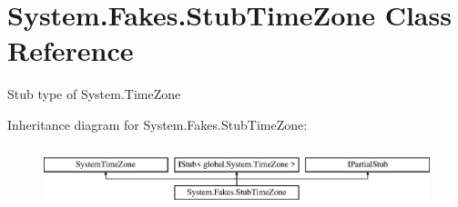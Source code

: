 \hypertarget{class_system_1_1_fakes_1_1_stub_time_zone}{\section{System.\-Fakes.\-Stub\-Time\-Zone Class Reference}
\label{class_system_1_1_fakes_1_1_stub_time_zone}
}


Stub type of System.\-Time\-Zone 


Inheritance diagram for System.\-Fakes.\-Stub\-Time\-Zone\-:\begin{figure}[H]
\begin{center}
\leavevmode
\includegraphics[height=1.777778cm]{class_system_1_1_fakes_1_1_stub_time_zone}
\end{center}
\end{figure}
